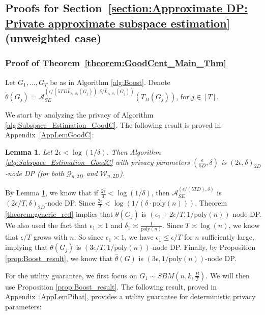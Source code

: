 \documentclass{article}
\newtheorem{lemma}{Lemma}
\newcommand{\thetahat}{\ensuremath{\widehat{\theta}}}
\begin{document}

\subsection{Proofs for Section~\ref{section:Approximate DP: Private approximate subspace estimation} (unweighted case)}

\subsubsection{Proof of Theorem~\ref{theorem:GoodCent_Main_Thm}}
\label{AppGoodUnwt}

Let $G_1, \dots, G_T$ be as in Algorithm \ref{alg:Boost}. Denote $\widetilde{\theta}(G_j) = \mathcal{A}_{SE}^{\left(\epsilon/(5TD\hat{L}_{\epsilon_1, \delta_1}(G_j)), \delta/\hat{L}_{\epsilon_1, \delta_1}(G_j)\right)}(T_{D}(G_j))$, for $j \in [T]$.

We start by analyzing the privacy of Algorithm \ref{alg:Subspace_Estimation_GoodC}. The following result is proved in Appendix~\ref{AppLemGoodC}:

\begin{lemma}
\label{lemma:GoodC_Priv}
Let $2\epsilon < \log(1/\delta)$. Then Algorithm \ref{alg:Subspace_Estimation_GoodC} with privacy parameters $\left(\frac{\epsilon}{5D}, \delta\right)$ is $(2\epsilon, \delta)_{2D}$-node DP (for both $\mathcal{G}_{n, 2D}$ and $\mathcal{W}_{n, 2D}$).
\end{lemma}

By Lemma \ref{lemma:GoodC_Priv}, we know that if $\frac{2\epsilon}{T} < \log(1/\delta)$, then $\mathcal{A}_{SE}^{(\epsilon/(5TD), \delta)}$ is $(2\epsilon/T, \delta)_{2D}$-node DP. Since $\frac{2\epsilon}{T} < \log(1/(\delta\cdot\mathrm{poly}(n)))$, Theorem \ref{theorem:generic_red} implies that $\widetilde{\theta}(G_j)$ is $(\epsilon_1 + 2\epsilon/T, 1/\mathrm{poly}(n))$-node DP. We also used the fact that $\epsilon_1 \asymp 1$ and $\delta_1 \asymp \frac{1}{\mathrm{poly}(n)}$. Since $T \asymp \log(n)$, we know that $\epsilon/T$ grows with $n$. So since $\epsilon_1 \asymp 1$, we have $\epsilon_1 \leq \epsilon/T$ for $n$ sufficiently large, implying that $\widetilde{\theta}(G_j)$ is $(3\epsilon/T, 1/\mathrm{poly}(n))$-node DP. Finally, by Proposition \ref{prop:Boost_result}, we know that $\thetahat(G)$ is $(3\epsilon, 1/\mathrm{poly}(n))$-node DP.

For the utility guarantee, we first focus on $G_1 \sim SBM\left(n, k, \frac{B}{T}\right)$. We will then use Proposition \ref{prop:Boost_result}. The following result, proved in Appendix~\ref{AppLemPihat}, provides a utility guarantee for deterministic privacy parameters:
\end{document}
